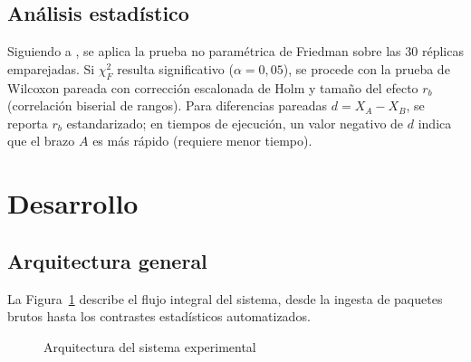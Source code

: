\documentclass[11pt,a4paper]{article}
\begin{document}
\subsection{Análisis estadístico}
Siguiendo a \textcite{demsar2006}, se aplica la prueba no paramétrica de Friedman sobre las 30 réplicas emparejadas. Si $\chi_F^2$ resulta significativo ($\alpha = 0{,}05$), se procede con la prueba de Wilcoxon pareada con corrección escalonada de Holm y tamaño del efecto $r_b$ (correlación biserial de rangos). Para diferencias pareadas $d = X_A - X_B$, se reporta $r_b$ estandarizado; en tiempos de ejecución, un valor negativo de $d$ indica que el brazo $A$ es más rápido (requiere menor tiempo).

\section{Desarrollo}

\subsection{Arquitectura general}
La Figura~\ref{fig:arq} describe el flujo integral del sistema, desde la ingesta de paquetes brutos hasta los contrastes estadísticos automatizados.

\begin{figure}[ht]
\centering
\caption{Arquitectura del sistema experimental}
\label{fig:arq}
\end{figure}
\end{document}
